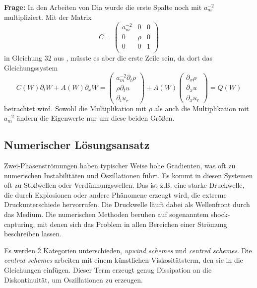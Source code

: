 {\bf Frage:} In den Arbeiten von Dia wurde die erste Spalte noch mit
$a_m^{-2}$ multipliziert. Mit der Matrix 
\begin{equation}
C = \left(\begin{array}{ccc}
a_m^{-2}&  0 & 0\\[2mm]
0 &  \rho & 0\\[2mm]
0 &  0 & 1\\[2mm]
\end{array}\right)
\end{equation}
in Gleichung 32 aus \cite{dia_2009}, müsste es aber die erste
Zeile sein, da dort das Gleichungssystem
\[
C(W) \partial_t W + A(W) \partial_x W = 
\left(
\begin{array}{c}
a_m^{-2}\partial_t \rho\\
\rho \partial_t u\\
\partial_t u_r
\end{array}
\right)
 + A(W) 
\left(
\begin{array}{c}
\partial_x \rho\\
\partial_x u\\
\partial_x u_r
\end{array}
\right)
= Q(W)
\]
betrachtet wird. Sowohl die Multiplikation mit $\rho$ als auch die
Multiplikation mit $a_m^{-2}$ ändern die Eigenwerte nur um diese
beiden Größen.




\subsection{Numerischer Lösungsansatz}

Zwei-Phasenströmungen haben typischer Weise hohe Gradienten, was oft
zu numerischen Instabilitäten und Oszillationen führt. Es kommt in
diesen Systemen oft zu Stoßwellen oder Verdünnungswellen. Das ist
z.B. eine starke Druckwelle, die durch Explosionen oder andere
Phänomene erzeugt wird, die extreme Druckunterschiede hervorrufen. Die
Druckwelle läuft dabei als Wellenfront durch das Medium. Die
numerischen Methoden beruhen auf sogenanntem shock-capturing, mit
denen sich das Problem in allen Bereichen einer Strömung beschreiben
lassen.

Es werden 2 Kategorien unterschieden, {\it upwind schemes} und {\it
  centred schemes}. Die {\it centred schemes} arbeiten mit einem
künstlichen Viskositätsterm, den sie in die Gleichungen
einfügen. Dieser Term erzeugt genug Dissipation an die Diskontinuität,
um Oszillationen zu erzeugen.


